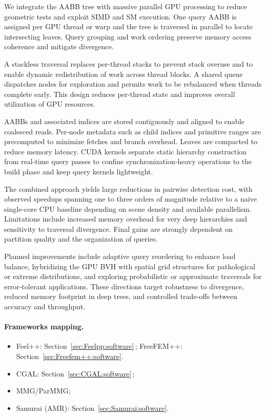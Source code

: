 We integrate the AABB tree with massive parallel GPU processing to reduce geometric tests and exploit SIMD and SM execution. One query AABB is assigned per GPU thread or warp and the tree is traversed in parallel to locate intersecting leaves. Query grouping and work ordering preserve memory access coherence and mitigate divergence.  

A stackless traversal replaces per-thread stacks to prevent stack overuse and to enable dynamic redistribution of work across thread blocks. A shared queue dispatches nodes for exploration and permits work to be rebalanced when threads complete early. This design reduces per‑thread state and improves overall utilization of GPU resources.  

AABBs and associated indices are stored contiguously and aligned to enable coalesced reads. Per‑node metadata such as child indices and primitive ranges are precomputed to minimize fetches and branch overhead. Leaves are compacted to reduce memory latency. CUDA kernels separate static hierarchy construction from real‑time query passes to confine synchronization‑heavy operations to the build phase and keep query kernels lightweight.  

The combined approach yields large reductions in pairwise detection cost, with observed speedups spanning one to three orders of magnitude relative to a naive single‑core CPU baseline depending on scene density and available parallelism. Limitations include increased memory overhead for very deep hierarchies and sensitivity to traversal divergence. Final gains are strongly dependent on partition quality and the organization of queries.  

Planned improvements include adaptive query reordering to enhance load balance, hybridizing the GPU BVH with spatial grid structures for pathological or extreme distributions, and exploring probabilistic or approximate traversals for error‑tolerant applications. These directions target robustness to divergence, reduced memory footprint in deep trees, and controlled trade‑offs between accuracy and throughput.



\paragraph{Frameworks mapping.}
\begin{itemize}
    \item Feel++: Section~\ref{sec:Feelpp:software}\,; FreeFEM++: Section~\ref{sec:Freefem++:software}.
    \item CGAL: Section~\ref{sec:CGAL:software}\,; 
    \item MMG/ParMMG;
    \item Samurai (AMR): Section~\ref{sec:Samurai:software}.
\end{itemize}

